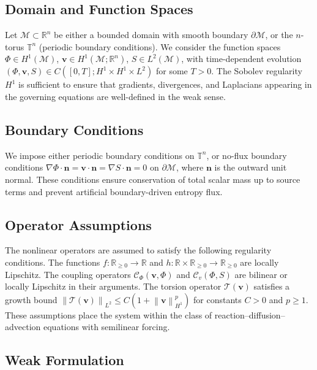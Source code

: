 \documentclass[11pt, a4paper]{article}
\theoremstyle{plain}
\theoremstyle{definition}
\newcommand{\Phifield}{\Phi}
\newcommand{\vfield}{\mathbf{v}}
\newcommand{\Sfield}{S}
\newcommand{\statespace}{\mathcal{M}}
\newcommand{\norm}[1]{\left\lVert #1 \right\rVert}
\begin{document}
\subsection{Domain and Function Spaces}

Let $\statespace \subset \mathbb{R}^n$ be either a bounded domain with smooth
boundary $\partial \statespace$, or the $n$-torus $\mathbb{T}^n$ (periodic
boundary conditions). We consider the function spaces
$\Phifield \in H^1(\statespace)$,
$\vfield \in H^1(\statespace; \mathbb{R}^n)$,
$\Sfield \in L^2(\statespace)$,
with time-dependent evolution
$({\Phifield}, {\vfield}, {\Sfield}) \in C([0,T]; H^1 \times H^1 \times L^2)$
for some $T > 0$.
The Sobolev regularity $H^1$ is sufficient to ensure that gradients,
divergences, and Laplacians appearing in the governing equations are
well-defined in the weak sense.

\subsection{Boundary Conditions}

We impose either periodic boundary conditions on $\mathbb{T}^n$, or no-flux
boundary conditions $\nabla \Phifield \cdot \mathbf{n} = \vfield \cdot \mathbf{n} = \nabla \Sfield \cdot \mathbf{n} = 0$ on $\partial \statespace$,
where $\mathbf{n}$ is the outward unit normal. These conditions ensure
conservation of total scalar mass up to source terms and prevent
artificial boundary-driven entropy flux.

\subsection{Operator Assumptions}

The nonlinear operators are assumed to satisfy the following regularity
conditions. The functions $f : \mathbb{R}_{\geq 0} \to \mathbb{R}$ and
$h : \mathbb{R} \times \mathbb{R}_{\geq 0} \to \mathbb{R}_{\geq 0}$ are
locally Lipschitz. The coupling operators $\mathcal{C}_\Phi(\vfield, \Phifield)$
and $\mathcal{C}_v(\Phifield, \Sfield)$ are bilinear or locally Lipschitz in
their arguments. The torsion operator $\mathcal{T}(\vfield)$ satisfies a
growth bound
$\norm{\mathcal{T}(\vfield)}_{L^2} \leq C(1 + \norm{\vfield}_{H^1}^p)$
for constants $C > 0$ and $p \geq 1$.
These assumptions place the system within the class of reaction--diffusion--advection
equations with semilinear forcing.

\subsection{Weak Formulation}
\end{document}
